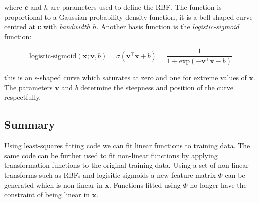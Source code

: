 \documentclass{article}
\begin{document}
where $\mathbf{c}$ and $h$ are parameters used to define the RBF. The function is proportional to a Gaussian probability density function, it is a bell shaped curve centred at $\mathbf{c}$ with \emph{bandwidth} $h$. Another basis function is the \emph{logistic-sigmoid} function:

\[
\text{logistic-sigmoid}(\mathbf{x}; \mathbf{v}, b) = \sigma(\mathbf{v}^\top \mathbf{x} + b) = \frac{1}{1+\text{exp}(-\mathbf{v}^\top \mathbf{x} - b)}
\]

this is an s-shaped curve which saturates at zero and one for extreme values of $\mathbf{x}$. The parameters $\mathbf{v}$ and $b$ determine the steepness and position of the curve respectfully.

\subsection{Summary}

Using least-squares fitting code we can fit linear functions to training data.
The same code can be further used to fit non-linear functions by applying transformation functions to the original training data.
Using a set of non-linear transforms such as RBFs and logisitic-sigmoids a new feature matrix $\Phi$ can be generated which is non-linear in $\mathbf{x}$.
Functions fitted using $\Phi$ no longer have the constraint of being linear in $\mathbf{x}$.
\end{document}

